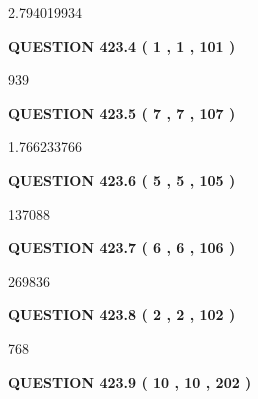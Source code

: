 \documentclass{ctexart}
\begin{document}
2.794019934
 
 
  
\vspace{0.2in}
  
{\textbf{\Large{QUESTION
423.4 
 ( 1 , 1 , 101 )
}}}
  
  
 
 
\noindent{}

939
 
 
  
\vspace{0.2in}
  
{\textbf{\Large{QUESTION
423.5 
 ( 7 , 7 , 107 )
}}}
  
  
 
 
\noindent{}

1.766233766
 
 
  
\vspace{0.2in}
  
{\textbf{\Large{QUESTION
423.6 
 ( 5 , 5 , 105 )
}}}
  
  
 
 
\noindent{}

137088
 
 
  
\vspace{0.2in}
  
{\textbf{\Large{QUESTION
423.7 
 ( 6 , 6 , 106 )
}}}
  
  
 
 
\noindent{}

269836
 
 
  
\vspace{0.2in}
  
{\textbf{\Large{QUESTION
423.8 
 ( 2 , 2 , 102 )
}}}
  
  
 
 
\noindent{}

768
 
 
  
\vspace{0.2in}
  
{\textbf{\Large{QUESTION
423.9 
 ( 10 , 10 , 202 )
}}}
  
\end{document}
